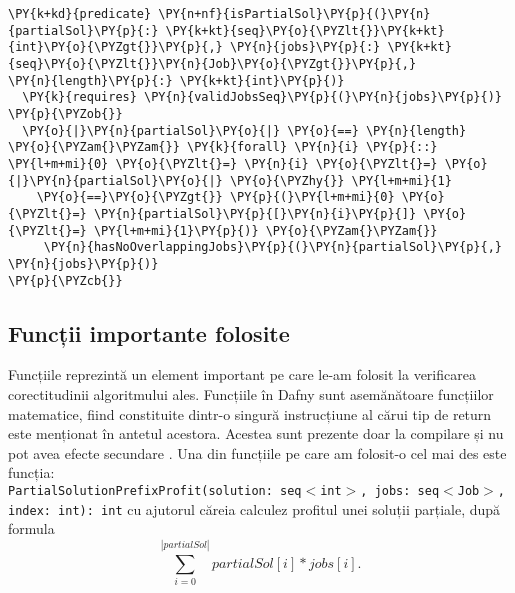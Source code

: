 \begin{itemize}
\begin{Verbatim}[commandchars=\\\{\}, fontsize=\footnotesize]
\PY{k+kd}{predicate} \PY{n+nf}{isPartialSol}\PY{p}{(}\PY{n}{partialSol}\PY{p}{:} \PY{k+kt}{seq}\PY{o}{\PYZlt{}}\PY{k+kt}{int}\PY{o}{\PYZgt{}}\PY{p}{,} \PY{n}{jobs}\PY{p}{:} \PY{k+kt}{seq}\PY{o}{\PYZlt{}}\PY{n}{Job}\PY{o}{\PYZgt{}}\PY{p}{,} 
\PY{n}{length}\PY{p}{:} \PY{k+kt}{int}\PY{p}{)}
  \PY{k}{requires} \PY{n}{validJobsSeq}\PY{p}{(}\PY{n}{jobs}\PY{p}{)}
\PY{p}{\PYZob{}}   
  \PY{o}{|}\PY{n}{partialSol}\PY{o}{|} \PY{o}{==} \PY{n}{length} \PY{o}{\PYZam{}\PYZam{}} \PY{k}{forall} \PY{n}{i} \PY{p}{::} \PY{l+m+mi}{0} \PY{o}{\PYZlt{}=} \PY{n}{i} \PY{o}{\PYZlt{}=} \PY{o}{|}\PY{n}{partialSol}\PY{o}{|} \PY{o}{\PYZhy{}} \PY{l+m+mi}{1}
    \PY{o}{==}\PY{o}{\PYZgt{}} \PY{p}{(}\PY{l+m+mi}{0} \PY{o}{\PYZlt{}=} \PY{n}{partialSol}\PY{p}{[}\PY{n}{i}\PY{p}{]} \PY{o}{\PYZlt{}=} \PY{l+m+mi}{1}\PY{p}{)} \PY{o}{\PYZam{}\PYZam{}}
     \PY{n}{hasNoOverlappingJobs}\PY{p}{(}\PY{n}{partialSol}\PY{p}{,} \PY{n}{jobs}\PY{p}{)}
\PY{p}{\PYZcb{}}
\end{Verbatim}
\end{itemize}


\subsection{Funcții importante folosite}
Funcțiile reprezintă un element important pe care le-am folosit la verificarea corectitudinii algoritmului ales. 
Funcțiile în Dafny sunt asemănătoare funcțiilor matematice, fiind constituite dintr-o singură instrucțiune al cărui tip de return este menționat în antetul acestora. Acestea sunt prezente doar
la compilare și nu pot avea efecte secundare \cite{DBLP:journals/jlap/BlazquezMS23}.
Una din funcțiile pe care am folosit-o cel mai des este funcția: \\\texttt{PartialSolutionPrefixProfit(solution: seq$<$int$>$, jobs: seq$<$Job$>$, index: int): int} cu ajutorul căreia calculez profitul unei soluții parțiale, după formula \[ \sum_{i=0}^{|partialSol|} partialSol[i] * jobs[i]. \]

